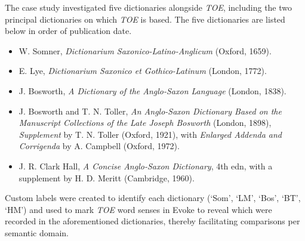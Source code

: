 The case study investigated five dictionaries alongside \textit{TOE}, including the two principal dictionaries on which \textit{TOE} is based. The five dictionaries are listed below in order of publication date. 
%
\begin{itemize}

\item
W. Somner, \textit{Dictionarium Saxonico-Latino-Anglicum} (Oxford, 1659).

\item
E. Lye, \textit{Dictionarium Saxonico et Gothico-Latinum} (London, 1772).

\item
J. Bosworth, \textit{A Dictionary of the Anglo-Saxon Language} (London, 1838).

\item
J. Bosworth and T. N. Toller, \textit{An Anglo-Saxon Dictionary Based on the Manuscript Collections of the Late Joseph Bosworth} (London, 1898), \textit{Supplement} by T. N. Toller (Oxford, 1921), with \textit{Enlarged Addenda and Corrigenda} by A. Campbell (Oxford, 1972).

\item
J. R. Clark Hall, \textit{A Concise Anglo-Saxon Dictionary}, 4th edn, with a supplement by H. D. Meritt (Cambridge, 1960).

\end{itemize}
%
Custom labels were created to identify each dictionary (`Som', `LM', `Bos', `BT', `HM') and used to mark \textit{TOE} word senses in Evoke to reveal which were recorded in the aforementioned dictionaries, thereby facilitating comparisons per semantic domain. 


